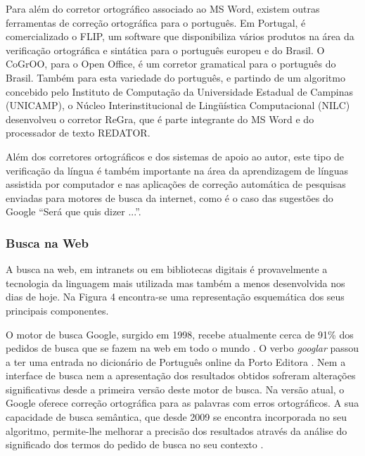 \begin{multicols}{2}

Para além do corretor ortográfico associado ao MS Word, existem ou\-tras ferramentas de correção ortográfica para o português. 
Em Portugal, é comercializado o FLIP, um software que disponibiliza vários produtos na área da verificação ortográfica 
e sintática para o português europeu e do Brasil. O CoGrOO, para o Open Office, é um corretor gramatical para o português do Brasil. 
Também para esta variedade do português, e partindo de um algoritmo concebido pelo Instituto de Computação da
Universidade Estadual de Campinas (UNICAMP), o Núcleo Interinstitucional de Lingüística Computacional (NILC) 
desenvolveu o corretor ReGra, que é parte integrante do MS Word e do processador de texto REDATOR.

Além dos corretores ortográficos e dos sistemas de apoio ao autor, este tipo de verificação da língua é também importante na área da aprendizagem de línguas assistida por computador e nas aplicações de correção automática de pesquisas enviadas para motores de busca da internet, como é o caso das sugestões do Google “Será que quis dizer ...”.

\subsubsection{Busca na Web}

A busca na web, em intranets ou em bibliotecas digitais é provavelmente a tecnologia da linguagem mais utilizada mas também a menos desenvolvida nos dias de hoje. Na Figura 4 encontra-se uma representação esquemática dos seus principais componentes.

O motor de busca Google, surgido em 1998, recebe atualmente cerca de 91\% dos pedidos de busca que se fazem na web em todo o mundo \cite{spi1}. 
O verbo \textit{googlar} passou a ter uma entrada no dicionário de Português online da Porto Editora \cite{portoeditoraonline}. 
Nem a interface de busca nem a apresentação dos resultados obtidos sofreram alterações significativas desde a primeira versão deste motor de busca. 
Na versão atual, o Google o\-fe\-re\-ce correção ortográfica para as palavras com erros ortográficos. 
A sua capacidade de busca semântica, que desde 2009 se encontra incorporada no seu algoritmo, 
permite-lhe melhorar a precisão dos resultados através da análise do significado dos termos do pedido de busca no seu contexto \cite{pc1}. 


\end{multicols}

